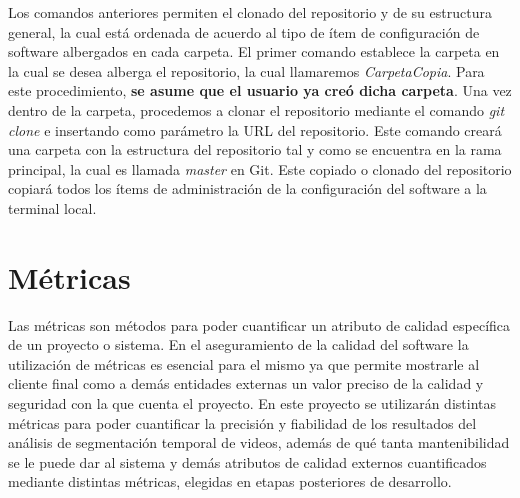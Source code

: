 \documentclass[a4paper]{article}
\newcommand\tab[1][0.55cm]{\hspace*{#1}}
\begin{document}
\tab Los comandos anteriores permiten el clonado del repositorio y de su estructura general, la cual está ordenada de acuerdo al tipo de ítem de configuración de software albergados en cada carpeta. El primer comando establece la carpeta en la cual se desea alberga el repositorio, la cual llamaremos \textit{CarpetaCopia}. Para este procedimiento, \textbf{se asume que el usuario ya creó dicha carpeta}. Una vez dentro de la carpeta, procedemos a clonar el repositorio mediante el comando \textit{git clone} e insertando como parámetro la URL del repositorio. Este comando creará una carpeta con la estructura del repositorio tal y como se encuentra en la rama principal, la cual es llamada \textit{master} en Git. Este copiado o clonado del repositorio copiará todos los ítems de administración de la configuración del software a la terminal local.   \\


\justify 
\newpage
\color{Blue}
\centering{ \rule{16cm}{0.1cm} } 
\justify 
\section{\textbf{Métricas}}
\color{black}

\justify
\tab Las métricas son métodos para poder cuantificar un atributo de calidad específica de un proyecto o sistema. En el aseguramiento de la calidad del software la utilización de métricas es esencial para el mismo ya que permite mostrarle al cliente final como a demás entidades externas un valor preciso de la calidad y seguridad con la que cuenta el proyecto. En este proyecto se utilizarán distintas métricas para poder cuantificar la precisión y fiabilidad de los resultados del análisis de segmentación temporal de videos, además de qué tanta mantenibilidad se le puede dar al sistema y demás atributos de calidad externos cuantificados mediante distintas métricas, elegidas en etapas posteriores de desarrollo. \\    
\end{document}

